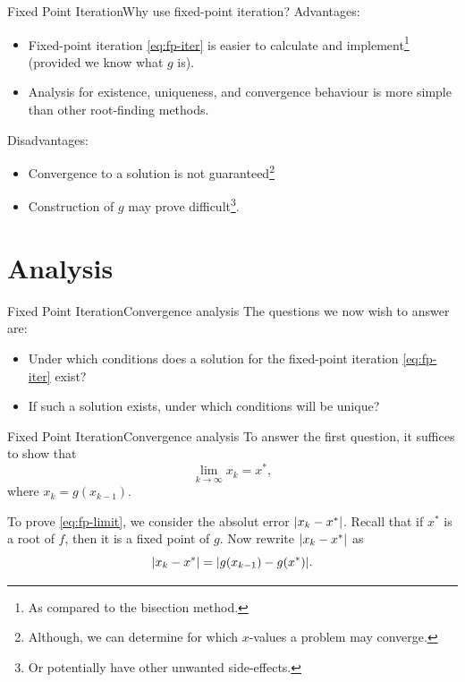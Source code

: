 \documentclass[12pt,aspectratio=169]{beamer}
\DeclarePairedDelimiter{\abs}{\lvert}{\rvert}
\begin{document}
\begin{frame}{Fixed Point Iteration}{Why use fixed-point iteration?}
  Advantages:
  \begin{itemize}
    \item Fixed-point iteration \eqref{eq:fp-iter} is easier to calculate and
      implement\footnote{As compared to the bisection method.} (provided we know
      what $g$ is).
    \item Analysis for existence, uniqueness, and convergence behaviour is more
      simple than other root-finding methods.
  \end{itemize}
  Disadvantages:
  \begin{itemize}
    \item Convergence to a solution is not guaranteed\footnote{Although, we can
      determine for which $x$-values a problem may converge.}
    \item Construction of $g$ may prove difficult\footnote{Or potentially have
      other unwanted side-effects.}.
  \end{itemize}
\end{frame}

\section{Analysis}
\begin{frame}{Fixed Point Iteration}{Convergence analysis}
  The questions we now wish to answer are:
  \begin{itemize}
    \item Under which conditions does a solution for the fixed-point iteration
      \eqref{eq:fp-iter} exist?
    \item If such a solution exists, under which conditions will be unique?
  \end{itemize}
\end{frame}

\begin{frame}{Fixed Point Iteration}{Convergence analysis}
  To answer the first question, it suffices to show that
  \begin{equation} \label{eq:fp-limit}
    \lim_{k\to \infty} x_k = x^*,
  \end{equation}
  where $x_k = g(x_{k-1})$.

  To prove \eqref{eq:fp-limit}, we consider the absolut error $\abs{x_k - x^*}$.
  Recall that if $x^*$ is a root of $f$, then it is a fixed point of $g$.
  Now rewrite $\abs{x_k - x^*}$ as
  \[
    \abs{x_k - x^*}
    = \abs{g(x_{k-1}) - g(x^*)}.
  \]

\end{frame}
\end{document}
